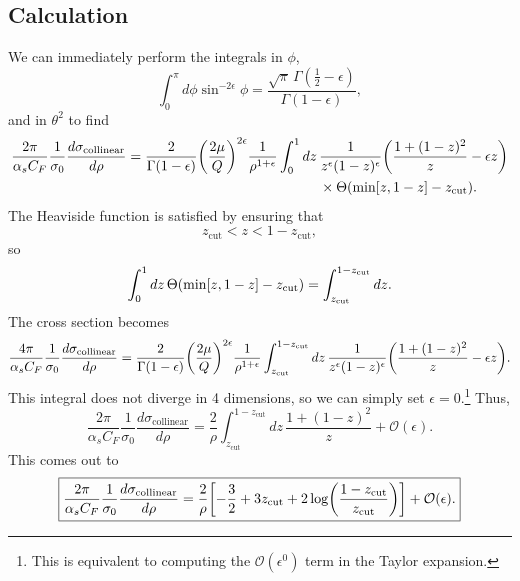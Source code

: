 \documentclass[../thesis.tex]{subfiles}
\providecommand{\zcut}{z_\mathrm{{cut}}}
\providecommand{\cO}{\mathcal{O}}
\begin{document}
\subsection{Calculation}
	We can immediately perform the integrals in $\phi$,
	\begin{equation}
		\int_0^{\pi} d\phi \sin^{-2\epsilon}\phi = \frac{\sqrt{\pi}\,\Gamma(\frac{1}{2} - \epsilon)}{\Gamma(1 - \epsilon)},
	\end{equation}
	and in $\theta^2$ to find
	\begin{equation}
	\begin{aligned}
		\frac{2\pi}{\alpha_s C_F} \frac{1}{\sigma_0}\frac{d\sigma_{\text{collinear}}}{d\rho} = \frac{2}{\Gamma(1 - \epsilon)} \qty(\frac{2\mu}{Q})^{2\epsilon} \frac{1}{\rho^{1+\epsilon}}\int_0^1 dz \,&\frac{1}{z^\epsilon(1 - z)^{\epsilon}}\qty(\frac{1 + (1 - z)^2}{z} - \epsilon z)\\
			&\times \Theta\qty(\min[z, 1 - z] - \zcut).
	\end{aligned}
	\end{equation}
	The Heaviside function is satisfied by ensuring that
	\begin{equation}
		\zcut < z < 1 - \zcut,
	\end{equation}
	so
	\begin{equation}
		\int_0^1 dz\, \Theta\qty(\min[z, 1 - z] - \zcut) = \int_{\zcut}^{1 - \zcut} dz.
	\end{equation}
	The cross section becomes
	\begin{equation}
	\begin{aligned}
		\frac{4\pi}{\alpha_s C_F} \frac{1}{\sigma_0}\frac{d\sigma_{\text{collinear}}}{d\rho} = \frac{2}{\Gamma(1 - \epsilon)} \qty(\frac{2\mu}{Q})^{2\epsilon} \frac{1}{\rho^{1+\epsilon}}\int_{\zcut}^{1-\zcut} dz \,\frac{1}{z^\epsilon(1 - z)^{\epsilon}}\qty(\frac{1 + (1 - z)^2}{z} - \epsilon z).
	\end{aligned}
	\end{equation}
	This integral does not diverge in 4 dimensions, so we can simply set $\epsilon = 0$.\footnote{This is equivalent to computing the $\cO(\epsilon^0)$ term in the Taylor expansion.} Thus,
	\begin{equation}
		\frac{2\pi}{\alpha_s C_F} \frac{1}{\sigma_0}\frac{d\sigma_{\text{collinear}}}{d\rho} = \frac{2}{\rho}\int_{\zcut}^{1-\zcut} dz \,\frac{1 + (1 - z)^2}{z} + \cO(\epsilon).
	\end{equation}
	This comes out to
	\begin{equation}\label{leading-eq:collinear result}
	\boxed{
		\frac{2\pi}{\alpha_s C_F} \frac{1}{\sigma_0}\frac{d\sigma_{\text{collinear}}}{d\rho} = \frac{2}{\rho}\qty[-\frac{3}{2} + 3 \zcut + 2 \log(\frac{1-\zcut}{\zcut})] + \cO(\epsilon).
	}
	\end{equation}
\end{document}
